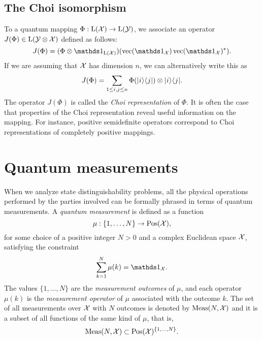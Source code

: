\subsection{The Choi isomorphism}
\label{sec:choi-isomorphism}

To a quantum mapping $\Phi : \mathrm{L}(\mathcal{X})\rightarrow\mathrm{L}(\mathcal{Y})$, we associate an 
operator $J(\Phi) \in \mathrm{L}(\mathcal{Y}\otimes\mathcal{X})$ defined as follows:
\begin{equation}
  J(\Phi) = (\Phi\otimes\I_{\Lin(\X)})(\vec(\I_{\X})\vec(\I_{\X})^{\ast}).
\end{equation}
If we are assuming that $\mathcal{X}$ has dimension $n$, we can alternatively write this as
\begin{equation}
  J(\Phi) = \sum_{1\leq i,j \leq n}\Phi(\lvert\mspace{0.5mu} i \mspace{0.5mu} \rangle\langle\mspace{0.5mu} j \mspace{0.5mu} \rvert)\otimes\lvert\mspace{0.5mu} i \mspace{0.5mu} \rangle\langle\mspace{0.5mu} j \mspace{0.5mu} \rvert.
\end{equation}
The operator $J(\Phi)$ is called the \emph{Choi representation}
of $\Phi$.
It is often the case that properties of the Choi representation reveal useful information 
on the mapping. For instance, positive semidefinite operators correspond to Choi representations 
of completely positive mappings.

\section{Quantum measurements}
\label{sec:quantum-measurements}
When we analyze state distinguishability problems, all the physical operations
performed by the parties involved can be formally phrased in terms of quantum measurements. 
A \emph{quantum measurement} is defined as a function 
\begin{equation}
\label{eq:def-measurement}
  \mu : \{ 1, \ldots, N \} \rightarrow \mathrm{Pos}(\mathcal{X}),
\end{equation}
for some choice of a positive integer $N > 0$ and a complex Euclidean space $\mathcal{X}$, 
satisfying the constraint
\begin{equation}
\label{eq:measurement-sum}
  \sum_{k=1}^{N} \mu(k) = \I_{\X}.
\end{equation}
The values $\{1, \ldots, N\}$ are the \emph{measurement outcomes} of $\mu$,
and each operator $\mu(k)$ is the \emph{measurement operator} of $\mu$ 
associated with the outcome $k$.
The set of all measurements over $\mathcal{X}$ with $N$ outcomes is denoted by 
$\mathrm{Meas}(N, \mathcal{X})$ and it is a subset of all functions of the same kind of $\mu$, that is,
\begin{equation}
  \mathrm{Meas}(N, \mathcal{X}) \subset \mathrm{Pos}(\mathcal{X})^{\{1,\ldots,N\}}.
\end{equation}

